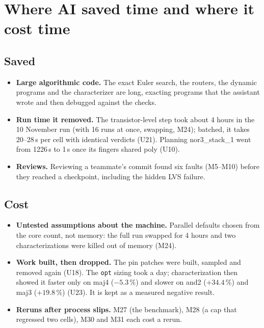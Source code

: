 \documentclass[10pt,a4paper]{article}
\newcommand{\code}[1]{\texttt{#1}}
\begin{document}
\section{Where AI saved time and where it cost time}
\subsection{Saved}
\begin{itemize}
\item \textbf{Large algorithmic code.} The exact Euler search, the routers, the dynamic programs and the characterizer are long, exacting programs that the assistant wrote and then debugged against the checks.
\item \textbf{Run time it removed.} The transistor-level step took about 4 hours in the 10 November run (with 16 runs at once, swapping, M24); batched, it takes 20--28\,s per cell with identical verdicts (U21). Planning nor3\_stack\_1 went from 1226\,s to 1\,s once its fingers shared poly (U10).
\item \textbf{Reviews.} Reviewing a teammate's commit found six faults (M5--M10) before they reached a checkpoint, including the hidden LVS failure.
\end{itemize}
\subsection{Cost}
\begin{itemize}
\item \textbf{Untested assumptions about the machine.} Parallel defaults chosen from the core count, not memory: the full run swapped for 4 hours and two characterizations were killed out of memory (M24).
\item \textbf{Work built, then dropped.} The pin patches were built, sampled and removed again (U18). The \code{opt} sizing took a day; characterization then showed it faster only on maj4 ($-5.3$\,\%) and slower on and2 ($+34.4$\,\%) and maj3 ($+19.8$\,\%) (U23). It is kept as a measured negative result.
\item \textbf{Reruns after process slips.} M27 (the benchmark), M28 (a cap that regressed two cells), M30 and M31 each cost a rerun.
\end{itemize}
\end{document}
